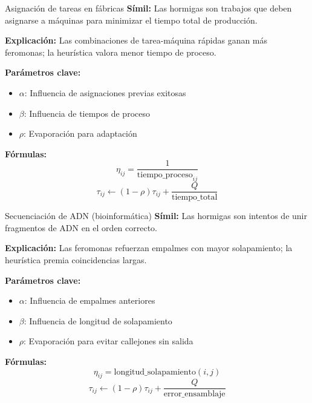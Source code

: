 \documentclass{beamer}
\begin{document}
\begin{frame}{Asignación de tareas en fábricas}
\textbf{Símil:} Las hormigas son trabajos que deben asignarse a máquinas para minimizar el tiempo total de producción.

\medskip
\textbf{Explicación:} Las combinaciones de tarea-máquina rápidas ganan más feromonas; la heurística valora menor tiempo de proceso.

\medskip
\textbf{Parámetros clave:}
\begin{itemize}[noitemsep]
    \item $\alpha$: Influencia de asignaciones previas exitosas
    \item $\beta$: Influencia de tiempos de proceso
    \item $\rho$: Evaporación para adaptación
\end{itemize}

\medskip
\textbf{Fórmulas:}
\[
\eta_{ij} = \frac{1}{\text{tiempo\_proceso}_{ij}}
\]
\[
\tau_{ij} \leftarrow (1-\rho)\tau_{ij} + \frac{Q}{\text{tiempo\_total}}
\]
\end{frame}

\begin{frame}{Secuenciación de ADN (bioinformática)}
\textbf{Símil:} Las hormigas son intentos de unir fragmentos de ADN en el orden correcto.

\medskip
\textbf{Explicación:} Las feromonas refuerzan empalmes con mayor solapamiento; la heurística premia coincidencias largas.

\medskip
\textbf{Parámetros clave:}
\begin{itemize}[noitemsep]
    \item $\alpha$: Influencia de empalmes anteriores
    \item $\beta$: Influencia de longitud de solapamiento
    \item $\rho$: Evaporación para evitar callejones sin salida
\end{itemize}

\medskip
\textbf{Fórmulas:}
\[
\eta_{ij} = \text{longitud\_solapamiento}(i,j)
\]
\[
\tau_{ij} \leftarrow (1-\rho)\tau_{ij} + \frac{Q}{\text{error\_ensamblaje}}
\]
\end{frame}
\end{document}
